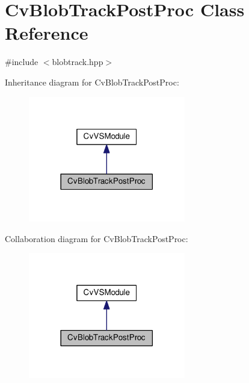 \hypertarget{classCvBlobTrackPostProc}{\section{Cv\-Blob\-Track\-Post\-Proc Class Reference}
\label{classCvBlobTrackPostProc}
}


{\ttfamily \#include $<$blobtrack.\-hpp$>$}



Inheritance diagram for Cv\-Blob\-Track\-Post\-Proc\-:\nopagebreak
\begin{figure}[H]
\begin{center}
\leavevmode
\includegraphics[width=194pt]{classCvBlobTrackPostProc__inherit__graph}
\end{center}
\end{figure}


Collaboration diagram for Cv\-Blob\-Track\-Post\-Proc\-:\nopagebreak
\begin{figure}[H]
\begin{center}
\leavevmode
\includegraphics[width=194pt]{classCvBlobTrackPostProc__coll__graph}
\end{center}
\end{figure}

